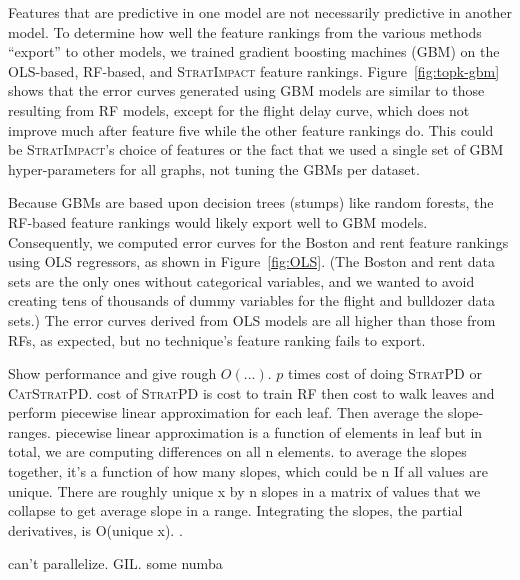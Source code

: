 \documentclass[11pt]{article}
\newcommand{\figref}[1]{Figure~\ref{#1}}
\newcommand{\todo}[1]{{{\color{red}{[#1]}}}}
\newcommand{\simp}{\fontfamily{cmr}\textsc{\small StratImpact}}
\newcommand{\spd}{\fontfamily{cmr}\textsc{\small StratPD}}
\newcommand{\cspd}{\fontfamily{cmr}\textsc{\small CatStratPD}}
\begin{document}
Features that are predictive in one model are not necessarily predictive in another model.  To determine how well the feature rankings from the various methods ``export'' to other models, we trained gradient boosting machines (GBM) on the OLS-based, RF-based, and \simp{} feature rankings. \figref{fig:topk-gbm} shows that the error curves generated using GBM models are similar to those resulting from RF models, except for the flight delay curve, which does not improve much after feature five while the other feature rankings do.  This could be \simp's choice of features or the fact that we used a single set of GBM hyper-parameters for all graphs, not tuning the GBMs per dataset. 

Because GBMs are based upon decision trees (stumps) like random forests, the RF-based feature rankings would likely export well to GBM models.  Consequently, we computed error curves for the Boston and rent feature rankings using OLS regressors, as shown in \figref{fig:OLS}. (The Boston and rent data sets are the only ones without categorical variables, and we wanted to avoid creating tens of thousands of dummy variables for the flight and bulldozer data sets.) The error curves derived from OLS models are all higher than those from RFs, as expected, but no technique's feature ranking fails to export.

Show performance and give rough $O(...)$. $p$ times cost of doing \spd{} or \cspd. cost of \spd{} is cost to train RF then cost to walk leaves and perform piecewise linear approximation for each leaf. Then average the slope-ranges.  piecewise linear approximation is a function of elements in leaf but in total, we are computing differences on all n elements. to average the slopes together, it's a function of how many slopes, which could be n If all values are unique. There are roughly unique x by n slopes in a matrix of values that we collapse to get average slope in a range.  Integrating the slopes, the partial derivatives, is O(unique x). \todo{ print out how many nx and nslopes are}.

can't parallelize. GIL. some numba
\end{document}
